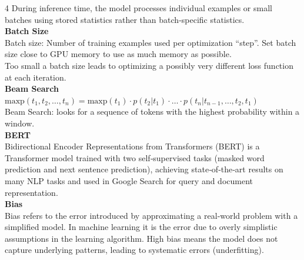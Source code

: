 \documentclass[8pt]{extarticle}
\begin{document}
\begin{multicols}{4}
During inference time, the model processes individual examples or small batches using stored statistics rather than batch-specific statistics.\\
\vspace{2pt}\textbf{Batch Size}\\
Batch size: Number of training examples used per optimization “step”. Set batch size close to GPU memory to use as much memory as possible.\\
Too small a batch size leads to optimizing a possibly very different loss function at each iteration.\\
\vspace{2pt}\textbf{Beam Search}\\
$\text{maxp}(t_1, t_2, \dots, t_n) = \text{maxp}(t_1) \cdot p(t_2|t_1) \cdot \dots \cdot p(t_n|t_{n-1}, \dots, t_2, t_1)$\\
Beam Search: looks for a sequence of tokens with the highest probability within a window.\\
\vspace{2pt}\textbf{BERT}\\
Bidirectional Encoder Representations from Transformers (BERT) is a Transformer model trained with two self‑supervised tasks (masked word prediction and next sentence prediction), achieving state‑of‑the‑art results on many NLP tasks and used in Google Search for query and document representation.\\
\vspace{2pt}\textbf{Bias}\\
Bias refers to the error introduced by approximating a real‑world problem with a simplified model. In machine learning it is the error due to overly simplistic assumptions in the learning algorithm. High bias means the model does not capture underlying patterns, leading to systematic errors (underfitting).\\


\end{multicols}
\end{document}
